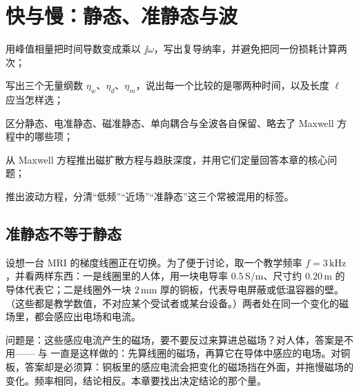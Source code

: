 \chapter{快与慢：静态、准静态与波}\label{ch:regimes}

\begin{chapterguide}
\begin{guidegoals}
\item 用峰值相量把时间导数变成乘以 $\jj\omega$，写出复导纳率，并避免把同一份损耗计算两次；
\item 写出三个无量纲数 $\eta_w$、$\eta_d$、$\eta_m$，说出每一个比较的是哪两种时间，以及长度 $\ell$ 应当怎样选；
\item 区分静态、电准静态、磁准静态、单向耦合与全波各自保留、略去了 Maxwell 方程中的哪些项；
\item 从 Maxwell 方程推出磁扩散方程与趋肤深度，并用它们定量回答本章的核心问题；
\item 推出波动方程，分清“低频”“近场”“准静态”这三个常被混用的标签。
\end{guidegoals}
\end{chapterguide}

\section{准静态不等于静态}\label{sec:regimes-quasistatic}

设想一台 MRI 的梯度线圈正在切换。为了便于讨论，取一个教学频率 $f=3\,\mathrm{kHz}$，并看两样东西：一是线圈里的人体，用一块电导率 $0.5\,\mathrm{S/m}$、尺寸约 $0.20\,\mathrm m$ 的导体代表它；二是线圈外一块 $2\,\mathrm{mm}$ 厚的铜板，代表导电屏蔽或低温容器的壁。（这些都是教学数值，不对应某个受试者或某台设备。）两者处在同一个变化的磁场里，都会感应出电场和电流。

问题是：这些感应电流产生的磁场，要不要反过来算进总磁场？对人体，答案是不用—— 与 一直是这样做的：先算线圈的磁场，再算它在导体中感应的电场。对铜板，答案却是必须算：铜板里的感应电流会把变化的磁场挡在外面，并拖慢磁场的变化。频率相同，结论相反。本章要找出决定结论的那个量。

